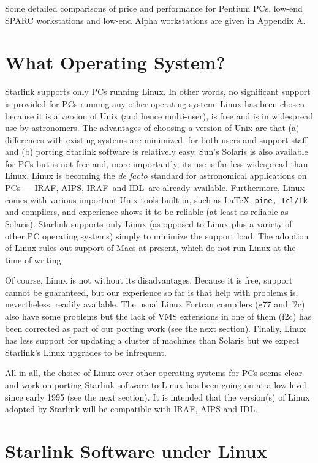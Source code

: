 \documentclass[twoside,11pt]{article}
\newcommand{\htmladdnormallink}[2]{#1}
\newcommand{\AIPS}{\small{AIPS}\normalsize}
\newcommand{\AIPSref}{\htmladdnormallink{\AIPS}{http://www.aips.nrao.edu/}}
\newcommand{\IDL}{\small{IDL}\normalsize}
\newcommand{\IDLref}{\htmladdnormallink{\IDL}{http://rsinc.com/idl/}}
\newcommand{\IRAF}{\small{IRAF}\normalsize}
\newcommand{\IRAFref}{\htmladdnormallink{\IRAF}{http://iraf.noao.edu/iraf-homepage.html}}
\newcommand{\MIDAS}{\small{IRAF}\normalsize}
\newcommand{\MIDASref}{\htmladdnormallink{\MIDAS}{http://www.eso.org/sci/data-processing/software/esomidas/}}
\begin{document}
Some detailed comparisons of price and performance for Pentium PCs,
low-end SPARC workstations and low-end Alpha workstations are given in
Appendix A.


\section{What Operating System?}

Starlink supports only PCs running Linux.  In other
words, no significant support is provided for PCs
running any other operating system.  Linux
has been chosen because it is a version of Unix (and hence multi-user),
is free and is in widespread use by astronomers.  The advantages of
choosing a version of Unix are that (a)
differences with existing systems are minimized, for both users and
support staff and (b) porting Starlink software is relatively easy. Sun's
Solaris is also available for PCs but is not free and, more importantly,
its use is far less widespread than Linux. Linux is becoming the {\em
de facto} standard for astronomical applications on PCs --- \IRAFref, 
\AIPSref, \MIDASref\ and \IDLref\ are already available.  Furthermore,
Linux comes with
various important Unix tools built-in, such as \LaTeX, {\tt pine, Tcl/Tk}
and compilers, and experience shows it to be reliable (at least as reliable
as Solaris).  Starlink supports only Linux
(as opposed to Linux plus a variety of other PC operating systems)
simply to minimize the support load.  The adoption of Linux rules out
support of Macs at present, which do not run Linux at the time of writing.

Of course, Linux is not without its disadvantages.  Because it is free,
support cannot be guaranteed, but our experience so far is that help
with problems is, nevertheless, readily available.  The usual Linux Fortran
compilers (g77 and f2c) also have some problems but the lack of VMS
extensions in one of them (f2c)  has been corrected as part of our
porting work (see the next section).  Finally, Linux has less support
for updating a cluster of machines than Solaris but we expect
Starlink's Linux upgrades to be infrequent.

All in all, the choice of Linux over other operating
systems for PCs seems clear and work on porting
Starlink software to Linux has been going on at a low level since
early 1995 (see the next section).  It is intended that the version(s)
of Linux adopted by Starlink will be compatible with IRAF, AIPS and IDL.

\section{Starlink Software under Linux}
\end{document}
